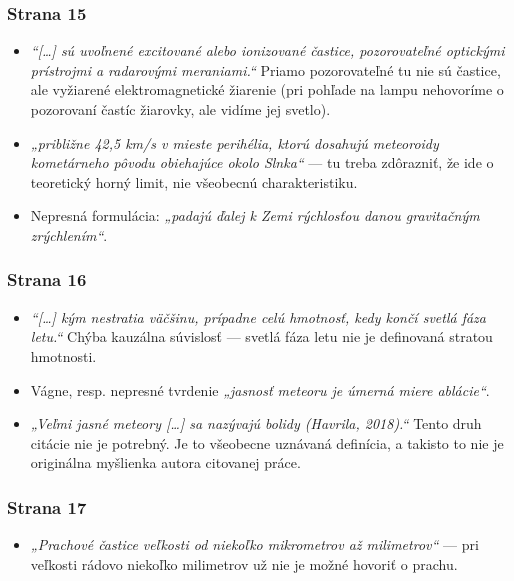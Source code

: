 \hypertarget{strana-15}{%
\subsubsection{Strana 15}\label{strana-15}}

\begin{itemize}
\tightlist
\item
  \emph{“{[}\ldots{}{]} sú uvoľnené excitované alebo ionizované
  častice, pozorovateľné optickými prístrojmi a radarovými meraniami.“}
  Priamo pozorovateľné tu nie sú častice, ale vyžiarené
  elektromagnetické žiarenie (pri pohľade na lampu nehovoríme o
  pozorovaní častíc žiarovky, ale vidíme jej svetlo).
\item
  \emph{„približne 42,5 km/s v mieste perihélia, ktorú dosahujú
  meteoroidy kometárneho pôvodu obiehajúce okolo Slnka“} --- tu treba
  zdôrazniť, že ide o teoretický horný limit, nie všeobecnú
  charakteristiku.
\item
  Nepresná formulácia: \emph{„padajú ďalej k Zemi rýchlosťou danou
  gravitačným zrýchlením“}.
\end{itemize}

\hypertarget{strana-16}{%
\subsubsection{Strana 16}\label{strana-16}}

\begin{itemize}
\tightlist
\item
  \emph{“{[}\ldots{}{]} kým nestratia väčšinu, prípadne celú hmotnosť,
  kedy končí svetlá fáza letu.“} Chýba kauzálna súvislosť --- svetlá
  fáza letu nie je definovaná stratou hmotnosti.
\item
  Vágne, resp. nepresné tvrdenie \emph{„jasnosť meteoru je úmerná miere
  ablácie“}.
\item
  \emph{„Veľmi jasné meteory {[}\ldots{}{]} sa nazývajú bolidy (Havrila,
  2018).“} Tento druh citácie nie je potrebný. Je to všeobecne uznávaná
  definícia, a takisto to nie je originálna myšlienka autora citovanej
  práce.
\end{itemize}

\hypertarget{strana-17}{%
\subsubsection{Strana 17}\label{strana-17}}

\begin{itemize}
\tightlist
\item
  \emph{„Prachové častice veľkosti od niekoľko mikrometrov až
  milimetrov“} --- pri veľkosti rádovo niekoľko milimetrov už nie je
  možné hovoriť o prachu.
\end{itemize}

